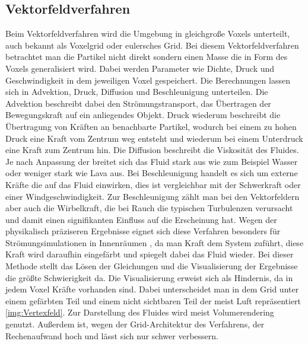 \documentclass[intern,palatino]{cgBA}
\begin{document}
\subsection{Vektorfeldverfahren}\label{vektor}
Beim Vektorfeldverfahren wird die Umgebung in gleichgroße Voxels unterteilt, auch bekannt als Voxelgrid oder eulersches Grid. Bei diesem Vektorfeldverfahren betrachtet man die Partikel nicht direkt sondern einen Masse die in Form des Voxels generalisiert wird. Dabei werden Parameter wie Dichte, Druck und Geschwindigkeit in dem jeweiligen Voxel gespeichert. Die Berechnungen lassen sich in Advektion, Druck, Diffusion und Beschleunigung unterteilen. Die Advektion beschreibt dabei den Strömungstransport, das Übertragen der Bewegungskraft auf ein anliegendes Objekt. Druck wiederum beschreibt die Übertragung von Kräften an benachbarte Partikel, wodurch bei einem zu hohen Druck eine Kraft vom Zentrum weg entsteht und wiederum bei einem Unterdruck eine Kraft zum Zentrum hin. Die Diffusion beschreibt die Viskosität des Fluides. Je nach Anpassung der breitet sich das Fluid stark aus wie zum Beispiel Wasser oder weniger stark wie Lava aus.
Bei Beschleunigung handelt es sich um externe Kräfte die auf das Fluid einwirken, dies ist vergleichbar mit der Schwerkraft oder einer Windgeschwindigkeit. Zur Beschleunigung zählt man bei den Vektorfeldern aber auch die Wirbelkraft, die bei Rauch die typischen Turbulenzen verursacht und damit einen signifikanten Einfluss auf die Erscheinung hat.
\newline
Wegen der physikalisch präziseren Ergebnisse eignet sich diese Verfahren besonders für Strömungsimulationen in Innenräumen \cite{franz}, da man Kraft dem System zuführt, diese Kraft wird daraufhin eingefärbt und spiegelt dabei das Fluid wieder.
\newline
Bei dieser Methode stellt das Lösen der Gleichungen und die Visualisierung der Ergebnisse die größte Schwierigkeit da. Die Visualisierung erweist sich als Hindernis, da in jedem Voxel Kräfte vorhanden sind. Dabei unterscheidet man in dem Grid unter einem gefärbten Teil und einem nicht sichtbaren Teil der meist Luft repräsentiert \ref{img:Vertexfeld}. Zur Darstellung des Fluides wird meist Volumerendering genutzt. Außerdem ist, wegen der Grid-Architektur des Verfahrens, der Rechenaufwand hoch und lässt sich nur schwer verbessern.
\end{document}
